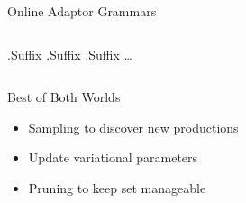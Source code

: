 \begin{frame}{Online Adaptor Grammars}
\begin{columns}
\begin{center}
{        .Suffix
        \hspace{2mm}
        .Suffix
        \hspace{2mm}
        .Suffix
        \hspace{2mm}
        \ldots
        \\
        \vspace{2mm}
      }
    \end{center}
  \end{columns}
\end{frame}

\begin{frame}{Best of Both Worlds}

\begin{itemize}
  \item Sampling to discover new productions
  \item Update variational parameters
  \item Pruning to keep set manageable
\end{itemize}

\end{frame}



